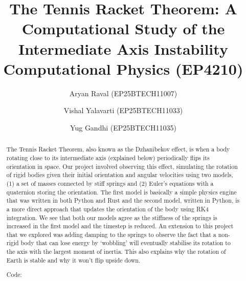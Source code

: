 \begin{frontmatter}
%
\title{%
The Tennis Racket Theorem: A Computational Study of the Intermediate Axis Instability\\
\small Computational Physics (EP4210)
}
%
\author{Aryan Raval (EP25BTECH11007)}
\author{Vishal Yalavarti (EP25BTECH11033)}  %
\author{Yug Gandhi (EP25BTECH11035)}        %
%
\renewcommand*{\today}{\DayMonthYearNoComma\displaydate{dateName}}
%
\begin{abstract}
The Tennis Racket Theorem, also known as the Dzhanibekov effect, is when a body rotating close to its intermediate axis (explained below) periodically flips its orientation in space.
Our project involved observing this effect, simulating the rotation of rigid bodies given their initial orientation and angular velocities using two models,
(1) a set of masses connected by stiff springs and (2) Euler's equations with a quaternion storing the orientation. The first model is basically a simple physics engine that was written in both Python and Rust
and the second model, written in Python, is a more direct approach that updates the orientation of the body using RK4 integration. We see that both our models agree as the stiffness of the springs is increased in the first model and the timestep is reduced.
An extension to this project that we explored was adding damping to the springs to observe the fact that a non-rigid body that can lose energy by `wobbling' will eventually stabilise its rotation to the axis with the largest moment of inertia.
This also explains why the rotation of Earth is stable and why it won't flip upside down.

\noindent Code: \href{\repourl}{\repourl}

\end{abstract}
%
\end{frontmatter}
%
